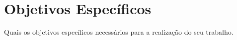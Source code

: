 \section{Objetivos Específicos}

  Quais os objetivos específicos necessários para a realização do seu trabalho.
